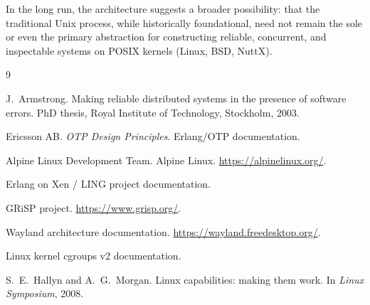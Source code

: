 \documentclass{article}
\begin{document}
In the long run, the architecture suggests a broader possibility: that the traditional Unix process,
while historically foundational, need not remain the sole or even the primary abstraction for
constructing reliable, concurrent, and inspectable systems on POSIX kernels (Linux, BSD, NuttX).


\begin{thebibliography}{9}

J.~Armstrong.
\newblock Making reliable distributed systems in the presence of software errors.
\newblock PhD thesis, Royal Institute of Technology, Stockholm, 2003.

Ericsson AB.
\newblock \emph{OTP Design Principles}.
\newblock Erlang/OTP documentation.

Alpine Linux Development Team.
\newblock Alpine Linux.
\newblock \url{https://alpinelinux.org/}.

Erlang on Xen / LING project documentation.

GRiSP project.
\newblock \url{https://www.grisp.org/}.

Wayland architecture documentation.
\newblock \url{https://wayland.freedesktop.org/}.

Linux kernel cgroups v2 documentation.

S.~E.~Hallyn and A.~G.~Morgan.
\newblock Linux capabilities: making them work.
\newblock In \emph{Linux Symposium}, 2008.

\end{thebibliography}
\end{document}
